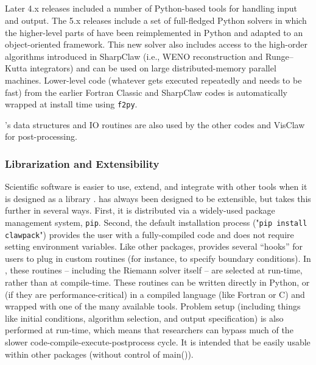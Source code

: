 %
%
%

\subsection{\pyclaw}

Later 4.x releases included a number of Python-based tools for handling
\clawpack input and output.  The 5.x releases include a set of full-fledged Python
solvers in which the higher-level parts of \clawpack have been reimplemented in
Python and adapted to an object-oriented framework.  This new solver also
includes access to the high-order algorithms introduced in SharpClaw (i.e.,
WENO reconstruction and Runge--Kutta integrators) and can be used on large
distributed-memory parallel machines.  Lower-level code (whatever gets executed
repeatedly and needs to be fast) from the earlier Fortran Classic and SharpClaw
codes is automatically wrapped at install time using \texttt{f2py}.

\pyclaw's data structures and IO routines are also used by the other \clawpack
codes and VisClaw for post-processing.

\subsubsection{Librarization and Extensibility}
Scientific software is easier to use, extend, and integrate with other tools when
it is designed as a library \cite{Brown:2015cj}.  \clawpack has always been designed
to be extensible, but \pyclaw takes this further in several ways.  First, it is
distributed via a widely-used package management system, \texttt{pip}.
Second, the default installation process ("\texttt{pip install clawpack}")
provides the user with a fully-compiled code and does not require setting environment
variables.  Like other \clawpack packages, \pyclaw provides several ``hooks'' for users
to plug in custom routines (for instance, to specify boundary conditions).
In \pyclaw, these routines -- including the Riemann solver itself -- are selected at
run-time, rather than at compile-time.  These routines can be written directly in
Python, or (if they are performance-critical) in a compiled language (like Fortran or C)
and wrapped with one of the many available tools.  Problem setup (including things like
initial conditions, algorithm selection, and output specification) is also
performed at run-time, which means that researchers can bypass much of the slower
code-compile-execute-postprocess cycle.
It is intended that \pyclaw be easily usable within other packages (without control of main()).

